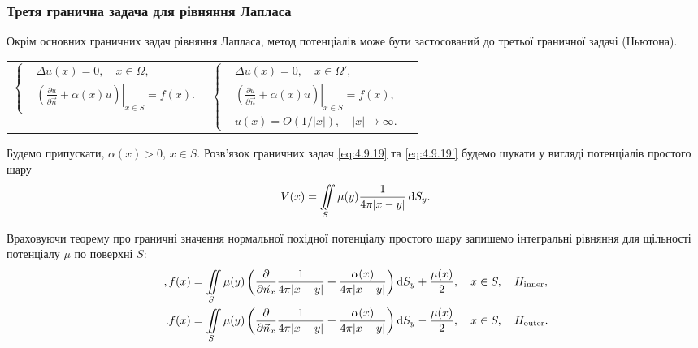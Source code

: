 \subsubsection{Третя гранична задача для рівняння Лапласа}

Окрім основних граничних задач рівняння Лапласа, метод потенціалів може бути застосований до третьої граничної задачі (Ньютона).
\begin{longtable}{p{} p{}p{}}
	\parbox{.45\textwidth}{\begin{equation}\label{eq:4.9.19}\left\{\begin{aligned}
		& \Delta u(x) = 0, \quad x \in \Omega, \\
		& \left. \left( \frac{\partial u}{\partial \vec n} + \alpha(x) u \right) \right|_{x \in S} = f(x).
	\end{aligned}\right.\end{equation}} & \parbox{.45\textwidth}{\begin{equation}\label{eq:4.9.19'}\left\{\begin{aligned}
		& \Delta u(x) = 0, \quad x \in \Omega', \\
		& \left. \left( \frac{\partial u}{\partial \vec n} + \alpha(x) u \right) \right|_{x \in S} = f(x), \\
		& u(x) = O(1/|x|), \quad |x| \to \infty.
	\end{aligned}\right.\end{equation}}
\end{longtable}

Будемо припускати, $\alpha(x) > 0$, $x \in S$. Розв'язок граничних задач \eqref{eq:4.9.19} та \eqref{eq:4.9.19'} будемо шукати у вигляді потенціалів простого шару
\begin{equation}
	V(x) = \displaystyle\iint\limits_S \mu(y) \frac{1}{4 \pi |x - y|} \mathop{}\!\mathrm{d} S_y.
\end{equation}

Враховуючи теорему про граничні значення нормальної похідної потенціалу простого шару запишемо інтегральні рівняння для щільності потенціалу $\mu$ по поверхні $S$:
\begin{align}
	\label{eq:4.9.20},
	f(x) &= \displaystyle\iint\limits_S \mu(y) \left( \frac{\partial}{\partial \vec n_x} \frac{1}{4 \pi |x - y|} + \frac{\alpha(x)}{4 \pi |x - y|} \right) \mathop{}\!\mathrm{d} S_y + \frac{\mu(x)}{2}, \quad x \in S, \quad H_{\text{inner}}, \\
	\label{eq:4.9.20'}.
	f(x) &= \displaystyle\iint\limits_S \mu(y) \left( \frac{\partial}{\partial \vec n_x} \frac{1}{4 \pi |x - y|} + \frac{\alpha(x)}{4 \pi |x - y|} \right) \mathop{}\!\mathrm{d} S_y - \frac{\mu(x)}{2}, \quad x \in S, \quad H_{\text{outer}}.
\end{align}

